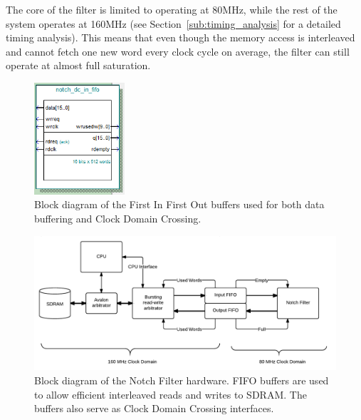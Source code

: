 \documentclass[]{article}
\begin{document}
The core of the filter is limited to operating at 80MHz, while the rest of the system operates at 160MHz (see Section~\ref{sub:timing_analysis} for a detailed timing analysis). This means that even though the memory access is interleaved and cannot fetch one new word every clock cycle on average, the filter can still operate at almost full saturation.

\begin{figure}[htbp]
	\begin{center}
		\includegraphics[width = 0.3\textwidth]{fifoBlock.PNG}
	\end{center}
	\caption{Block diagram of the First In First Out buffers used for both data buffering and Clock Domain Crossing.}
	\label{fig:fifoblock}
\end{figure}

\begin{landscape}
\begin{figure}[p]
	\begin{center}
		\includegraphics[width = 1.45\textwidth]{DSDNotch.pdf}
	\end{center}
	\caption{Block diagram of the Notch Filter hardware. FIFO buffers are used to allow efficient interleaved reads and writes to SDRAM. The buffers also serve as Clock Domain Crossing interfaces.}
	\label{fig:DSDNotch}
\end{figure}
\end{landscape}


\end{document}
